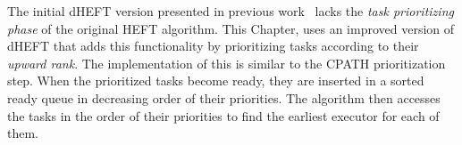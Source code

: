 The initial dHEFT version presented in previous work~\cite{Chronaki:ICS2015} lacks the \textit{task prioritizing phase} of the original HEFT algorithm.
This Chapter, uses an improved version of dHEFT that adds this functionality by prioritizing tasks according to their \textit{upward rank}.
The implementation of this is similar to the CPATH prioritization step.
When the prioritized tasks become ready, they are inserted in a sorted ready queue in decreasing order of their priorities.
The algorithm then accesses the tasks in the order of their priorities to find the earliest executor for each of them.
